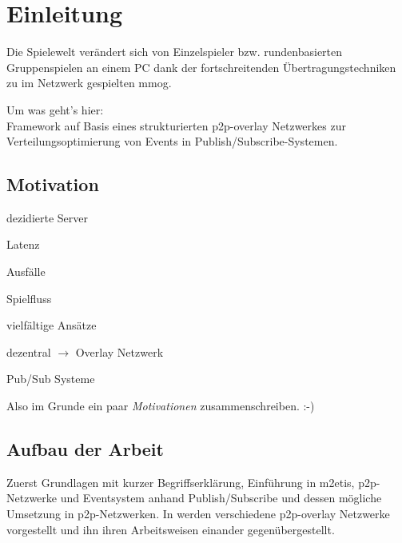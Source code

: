 \chapter{Einleitung}
\label{chap:einleitung}

Die Spielewelt verändert sich von Einzelspieler bzw. rundenbasierten Gruppenspielen an einem PC dank der fortschreitenden Übertragungstechniken zu im Netzwerk gespielten \ac{mmog}.

Um was geht's hier:\\
Framework auf Basis eines strukturierten p2p-overlay Netzwerkes zur Verteilungsoptimierung von Events in Publish/Subscribe-Systemen.

\section{Motivation}
\begin{itemize*}
\item dezidierte Server
\item Latenz
\item Ausfälle
\item Spielfluss
\end{itemize*}

\begin{itemize*}
\item vielfältige Ansätze \cite{Bharambe2008Donnybrook} %
\item dezentral $\rightarrow$ Overlay Netzwerk
\item Pub/Sub Systeme \cite{Knutsson2004Peertopeer, Triebel2008Peertopeer} %
\end{itemize*}

Also im Grunde ein paar \emph{Motivationen} zusammenschreiben. :-)

\cite{Fischer2010Event, Fischer2010a} %

\section{Aufbau der Arbeit}
Zuerst Grundlagen mit kurzer Begriffserklärung, Einführung in \ac{m2etis},  p2p-Netzwerke und Eventsystem anhand Publish/Subscribe und dessen mögliche Umsetzung in p2p-Netzwerken. In  werden verschiedene p2p-overlay Netzwerke vorgestellt und ihn ihren Arbeitsweisen einander gegenübergestellt.
